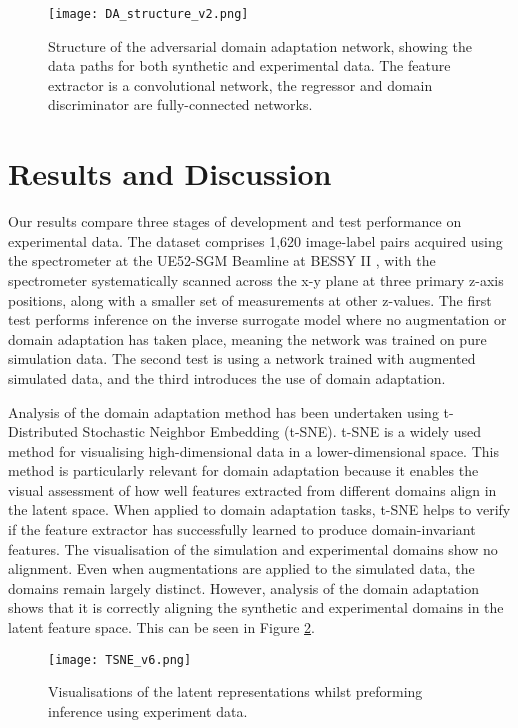 \documentclass{iopconfser}
\begin{document}
\begin{figure}[H]
    \centering
    \texttt{[image: DA\_structure\_v2.png]}
    \caption{Structure of the adversarial domain adaptation network, showing the data paths for both synthetic and experimental data. The feature extractor is a convolutional network, the regressor and domain discriminator are fully-connected networks.}
\label{network}
\end{figure}

\section{Results and Discussion}
Our results compare three stages of development and test performance on experimental data. The dataset comprises 1,620 image-label pairs acquired using the spectrometer at the UE52-SGM Beamline at BESSY II \cite{ue52}, with the spectrometer systematically scanned across the x-y plane at three primary z-axis positions, along with a smaller set of measurements at other z-values. The first test performs inference on the inverse surrogate model where no augmentation or domain adaptation has taken place, meaning the network was trained on pure simulation data. The second test is using a network trained with augmented simulated data, and the third introduces the use of domain adaptation.

Analysis of the domain adaptation method has been undertaken using t-Distributed Stochastic Neighbor Embedding (t-SNE). t-SNE is a widely used method for visualising high-dimensional data in a lower-dimensional space. This method is particularly relevant for domain adaptation because it enables the visual assessment of how well features extracted from different domains align in the latent space. When applied to domain adaptation tasks, t-SNE helps to verify if the feature extractor has successfully learned to produce domain-invariant features. The visualisation of the simulation and experimental domains show no alignment. Even when augmentations are applied to the simulated data, the domains remain largely distinct. However, analysis of the domain adaptation shows that it is correctly aligning the synthetic and experimental domains in the latent feature space. This can be seen in Figure \ref{tsne}.

\begin{figure}[H]
    \centering
    \texttt{[image: TSNE\_v6.png]}
    \caption{Visualisations of the latent representations whilst preforming inference using experiment data.}
\label{tsne}
\end{figure}
\end{document}
